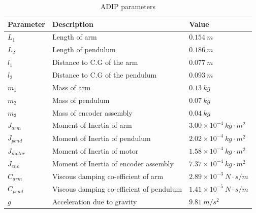 \begin{table}[H]
    \centering
    \begin{tabular}{lll}
         \toprule
         Parameter   & Description                              & Value\\
         \midrule
         $L_1$       & Length of arm                            & $0.154~m$\\
         $L_2$       & Length of pendulum                       & $0.186~m$ \\
         $l_1$       & Distance to C.G of the arm               & $0.077~m$\\
         $l_2$       & Distance to C.G of the pendulum          & $0.093~m$\\
         $m_1$       & Mass of arm                              & $0.13~kg$\\
         $m_2$       & Mass of pendulum                         & $0.07~kg$\\
         $m_3$       & Mass of encoder assembly                 & $0.04~kg$\\
         $J_{arm}$   & Moment of Inertia of arm                 & $3.00 \times 10^{-4}~kg{\cdot}m^2$\\
         $J_{pend}$  & Moment of Inertia of pendulum            & $2.02 \times 10^{-4} ~ kg{\cdot}m^2$\\
         $J_{motor}$ & Moment of Inertia of motor               & $1.58 \times 10^{-4}~kg{\cdot}m^2$\\
         $J_{enc}$   & Moment of Inertia of encoder assembly    & $7.37 \times 10^{-4}~kg{\cdot}m^2$\\
         $C_{arm}$   & Viscous damping co-efficient of arm      & $2.89 \times 10^{-3}~N{\cdot}s/m$\\
         $C_{pend}$  & Viscous damping co-efficient of pendulum & $1.41 \times 10^{-5}~N{\cdot}s/m$\\
         $g$         & Acceleration due to gravity              & $9.81~m/s^2$\\
        \bottomrule
    \end{tabular}
    \caption{ADIP parameters}
    \label{tab:params}
\end{table}

